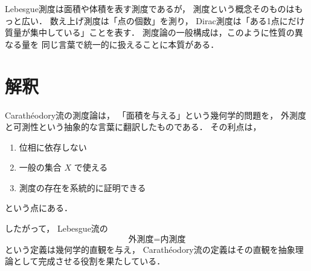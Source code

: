 \begin{remark}
Lebesgue測度は面積や体積を表す測度であるが，
測度という概念そのものはもっと広い．
数え上げ測度は「点の個数」を測り，
Dirac測度は「ある1点にだけ質量が集中している」ことを表す．
測度論の一般構成は，このように性質の異なる量を
同じ言葉で統一的に扱えることに本質がある．
\end{remark}

\section{解釈}

Carathéodory流の測度論は，
「面積を与える」という幾何学的問題を，
外測度と可測性という抽象的な言葉に翻訳したものである．
その利点は，
\begin{enumerate}
    \item 位相に依存しない
    \item 一般の集合 $X$ で使える
    \item 測度の存在を系統的に証明できる
\end{enumerate}
という点にある．

したがって，
Lebesgue流の
\[
\text{外測度}=\text{内測度}
\]
という定義は幾何学的直観を与え，
Carathéodory流の定義はその直観を抽象理論として完成させる役割を果たしている．
